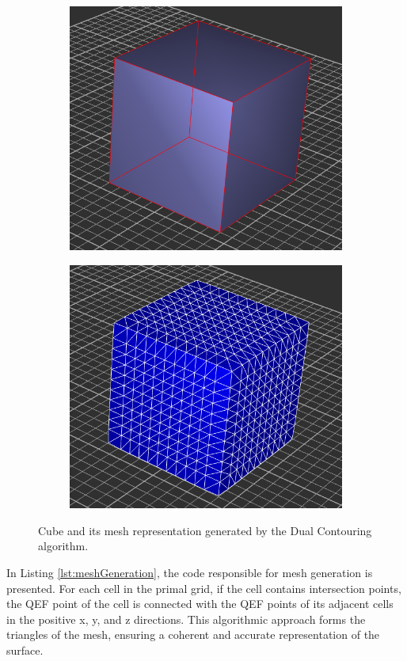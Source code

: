 \begin{figure}[H]
    \centering
    \begin{subfigure}{0.5\textwidth}
        \centering
        \includegraphics[height=0.7\textwidth, width=0.85\linewidth]{Figures/cube0.png}
    \end{subfigure}%
    \begin{subfigure}{0.5\textwidth}
        \centering
        \includegraphics[height=0.7\textwidth, width=0.85\linewidth]{Figures/cube0-DC.png}
    \end{subfigure}
    \decoRule
    \caption{Cube and its mesh representation generated by the Dual Contouring algorithm.}
    \label{fig:DC-cube}
\end{figure}

In Listing \ref{lst:meshGeneration}, the code responsible for mesh generation is presented. For each cell in the primal grid, if the cell contains intersection points, the QEF point of the cell is connected with the QEF points of its adjacent cells in the positive x, y, and z directions. This algorithmic approach forms the triangles of the mesh, ensuring a coherent and accurate representation of the surface.

